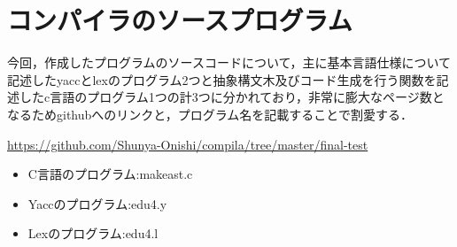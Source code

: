 \documentclass[a4j]{jarticle}
\begin{document}
\section{コンパイラのソースプログラム}

今回，作成したプログラムのソースコードについて，主に基本言語仕様について記述したyaccとlexのプログラム2つと抽象構文木及びコード生成を行う関数を記述したc言語のプログラム1つの計3つに分かれており，非常に膨大なページ数となるためgithubへのリンクと，プログラム名を記載することで割愛する．

\url{https://github.com/Shunya-Onishi/compila/tree/master/final-test}

\begin{itemize}
\item C言語のプログラム:makeast.c 
\item Yaccのプログラム:edu4.y
\item Lexのプログラム:edu4.l 
\end{itemize}
\end{document}
